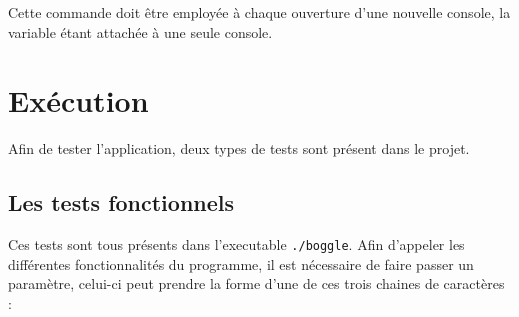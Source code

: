 \documentclass[12pt,a4paper,openany]{article}
\begin{document}
	Cette commande doit être employée à chaque ouverture d'une nouvelle console, la variable étant attachée à une seule console.  

	\section{Exécution}
	Afin de tester l'application, deux types de tests sont présent dans le projet.

		\subsection{Les tests fonctionnels} Ces tests sont tous présents dans l'executable
			\texttt{./boggle}. Afin d'appeler les différentes fonctionnalités du programme, il
			est nécessaire de faire passer un paramètre, celui-ci peut prendre la forme d'une
			de ces trois chaines de caractères : 
\end{document}
